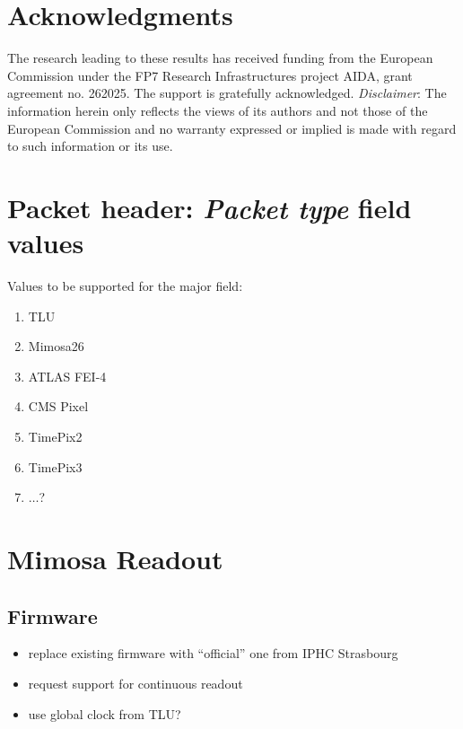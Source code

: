 \documentclass[paper=a4, fontsize=11pt]{scrartcl}	%
\numberwithin{equation}{section}		%
\numberwithin{figure}{section}			%
\numberwithin{table}{section}           	%
\begin{document}
\section{Acknowledgments}

  The research leading to these results has received funding from the
  European Commission under the FP7 Research Infrastructures project
  AIDA, grant agreement no. 262025. The support is gratefully
  acknowledged. 
  \emph{Disclaimer}: The information herein only reflects the views of its authors and not those of the European Commission and no warranty expressed or implied is made with regard to such information or its use.

\newpage
\appendix

\section{Packet header: \emph{Packet type} field values}
\label{app:packettype}
Values to be supported for the major field:
\begin{enumerate}
\item TLU
\item Mimosa26
\item ATLAS FEI-4
\item CMS Pixel
\item TimePix2
\item TimePix3
\item $\ldots$?
\end{enumerate}

\section{Mimosa Readout}

\subsection{Firmware}
\label{sec:firmware}
\begin{itemize}
\item replace existing firmware with ``official'' one from IPHC Strasbourg
\item request support for continuous readout
\item use global clock from TLU?
\end{itemize}
\end{document}
